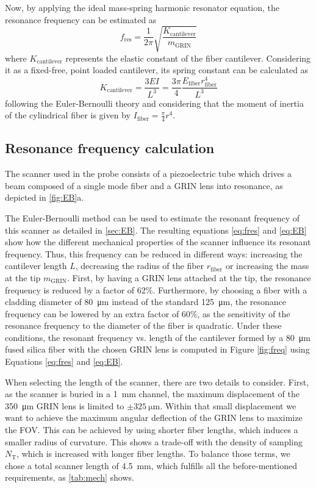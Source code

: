 \documentclass[10pt]{iopart}
\begin{document}
Now, by applying the ideal mass-spring harmonic resonator equation, the resonance frequency can be estimated as 
\begin{equation}
f_\mathrm{res} = \frac{1}{2 \pi} \sqrt{\frac{K_\mathrm{cantilever}}{m_{\mathrm{GRIN}}}} 
\label{eq:fres}
\end{equation}
where $K_\mathrm{cantilever}$ represents the elastic constant of the fiber cantilever. Considering it as a fixed-free, point loaded cantilever, its spring constant can be calculated as 
\begin{equation}
K_\mathrm{cantilever} = \frac{3 E I}{L^3} = \frac{3 \pi}{4} \frac{E_\mathrm{fiber} r_\mathrm{fiber}^4}{L^3}
\label{eq:EB}
\end{equation}
following the Euler-Bernoulli theory \cite{MarcJ.Madou2011} and considering that the moment of inertia of the cylindrical fiber is given by $I_\mathrm{fiber} = \frac{\pi}{4} r^4$. 

\subsection{Resonance frequency calculation}
The scanner used in the probe consists of a piezoelectric tube which drives a beam composed of a single mode fiber and a GRIN lens into resonance, as depicted in \autoref{fig:EB}a.  



The Euler-Bernoulli method can be used to estimate the resonant frequency of this scanner as detailed in \autoref{sec:EB}. The resulting equations \ref{eq:fres} and \ref{eq:EB} show how the different mechanical properties of the scanner influence its resonant frequency. Thus, this frequency can be reduced in different ways: increasing the cantilever length $L$, decreasing the radius of the fiber $r_\mathrm{fiber}$ or increasing the mass at the tip $m_{\mathrm{GRIN}}$. First, by having a GRIN lens attached at the tip, the resonance frequency is reduced by a factor of 62\%. Furthermore, by choosing a fiber with a cladding diameter of \SI{80}{\micro\meter} instead of the standard \SI{125}{\micro\meter}, the resonance frequency can be lowered by an extra factor of 60\%, as the sensitivity of the resonance frequency to the diameter of the fiber is quadratic. Under these conditions, the resonant frequency vs. length of the cantilever formed by a \SI{80}{\micro\meter} fused silica fiber with the chosen GRIN lens is computed in Figure \ref{fig:freq} using Equations \ref{eq:fres} and \ref{eq:EB}.

When selecting the length of the scanner, there are two details to consider. First, as the scanner is buried in a \SI{1}{\milli\meter} channel, the maximum displacement of the \SI{350}{\micro\meter} GRIN lens is limited to $\pm\SI{325}{\micro\meter}$. Within that small displacement we want to achieve the maximum angular deflection of the GRIN lens to maximize the FOV. This can be achieved by using shorter fiber lengths, which induces a smaller radius of curvature. This shows a trade-off with the density of sampling $N_\mathrm{T}$, which is increased with longer fiber lengths. To balance those terms, we chose a total scanner length of \SI{4.5}{\milli\meter}, which fulfills all the before-mentioned requirements, as \autoref{tab:mech} shows. 
\end{document}
